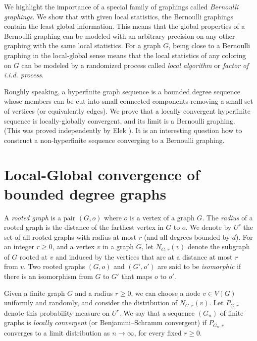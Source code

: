 \documentclass{article}
\begin{document}
We highlight the importance of a special family of graphings called
\emph{Bernoulli graphings}. We show that with given local statistics,
the Bernoulli graphings contain the least global information. This
means that the global properties of a Bernoulli graphing can be
modeled with an arbitrary precision on any other graphing with the
same local statistics.
For a graph $G$, being close to a Bernoulli graphing in the
{local-global sense means that the local statistics of any coloring
on $G$ can be modeled by a randomized process called \emph{local
algorithm} or \emph{factor of i.i.d. process}.}

Roughly speaking, a hyperfinite graph sequence is a bounded degree
sequence whose members can be cut into small connected components
removing a small set of vertices (or equivalently edges). {We prove
that a locally convergent hyperfinite sequence is locally-globally
convergent, and its limit is a Bernoulli graphing. (This was proved
independently by Elek \cite{Elek2}). It is an interesting question
how to construct a non-hyperfinite sequence converging to a Bernoulli
graphing.}

\section{Local-Global convergence of bounded degree graphs}

A \emph{rooted graph} is a pair $(G,o)$ where $o$ is a vertex of a
graph $G$. The \emph{radius} of a rooted graph is the distance of the
farthest vertex in $G$ to $o$. We denote by $U^{r}$ the set of all
rooted graphs with radius at most $r$ (and all degrees bounded by
$d$). For an integer $r \ge 0$, and a vertex $v$ in a graph $G$, let
$N_{G,r}(v)$ denote the subgraph of $G$ rooted at $v$ and induced by
the vertices that are at a distance at most $r$ from $v$. Two rooted
graphs $(G,o)$ and $(G',o')$ are said to be \emph{isomorphic} if
there is an isomorphism from $G$ to $G'$ that maps $o$ to $o'$.

Given a finite graph $G$ and a radius $r\ge 0$, we can choose a node
$v \in V(G)$ uniformly and randomly, and consider the distribution of
$N_{G,r}(v)$. Let $P_{G,r}$ denote this probability measure on $U^r$.
We say that a sequence $(G_n)$ of finite graphs is \emph{locally
convergent} (or Benjamini--Schramm convergent) if $P_{G_n,r}$
converges to a limit distribution as $n\to\infty$, for every fixed
$r\ge 0$.
\end{document}
